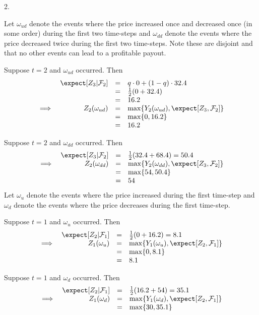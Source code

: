 \documentclass[11pt,a4paper]{article}
\begin{document}
\begin{answer}{2.}
  \par Let $\omega_{ud}$ denote the events where the price increased once and decreased once (in some order) during the first two time-steps and $\omega_{dd}$ denote the events where the price decreased twice during the first two time-steps. Note these are disjoint and that no other events can lead to a profitable payout.
  \par Suppose $t=2$ and $\omega_{ud}$ occurred. Then
  \[\begin{array}{rrcl}
    &\expect[Z_3|\mathcal{F}_2]&=&q\cdot0+(1-q)\cdot32.4\\
    &&=&\frac12(0+32.4)\\
    &&=&16.2\\
    \implies&Z_2(\omega_{ud})&=&\max\{Y_2(\omega_{ud}),\expect[Z_3,\mathcal{F}_2]\}\\
    &&=&\max\{0,16.2\}\\
    &&=&16.2
  \end{array}\]
  \par Suppose $t=2$ and $\omega_{dd}$ occurred. Then
  \[\begin{array}{rrcl}
    &\expect[Z_3|\mathcal{F}_2]&=&\frac12(32.4+68.4)=50.4\\
    \implies&Z_2(\omega_{dd})&=&\max\{Y_2(\omega_{dd}),\expect[Z_3,\mathcal{F}_2]\}\\
    &&=&\max\{54,50.4\}\\
    &&=&54
  \end{array}\]
  Let $\omega_u$ denote the events where the price increased during the first time-step and $\omega_d$ denote the events where the price decreases during the first time-step.
  \par Suppose $t=1$ and $\omega_{u}$ occurred. Then
  \[\begin{array}{rrcl}
    &\expect[Z_2|\mathcal{F}_1]&=&\frac12(0+16.2)=8.1\\
    \implies&Z_1(\omega_{u})&=&\max\{Y_1(\omega_{u}),\expect[Z_2,\mathcal{F}_1]\}\\
    &&=&\max\{0,8.1\}\\
    &&=&8.1
  \end{array}\]
  \par Suppose $t=1$ and $\omega_{d}$ occurred. Then
  \[\begin{array}{rrcl}
    &\expect[Z_2|\mathcal{F}_1]&=&\frac12(16.2+54)=35.1\\
    \implies&Z_1(\omega_{d})&=&\max\{Y_1(\omega_{d}),\expect[Z_2,\mathcal{F}_1]\}\\
    &&=&\max\{30,35.1\}\\

\end{array}\]
\end{answer}
\end{document}
